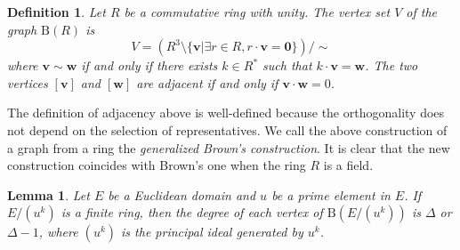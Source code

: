 \documentclass{article}
\newtheorem{Def}{Definition}
\newtheorem{Lem}{Lemma}
\newtheorem{Cor}[Lem]{Corollary}
\newcommand{\B}{\mathrm{B}}
\begin{document}
\begin{Def}
Let $R$ be a commutative ring with unity. The vertex set $V$ of the graph $\B(R)$ is 
\[ V = ( R^3 \setminus \{\bm v | \exists r \in R, r \cdot {\bm v} = {\bm 0} \} ) / \sim\]
where $\bm v \sim \bm w$ if and only if there exists $k \in R^*$ such that $k \cdot {\bm v} = {\bm w}$. The two vertices $[\bm v]$ and $[\bm w]$ are adjacent if and only if ${\bm v} \cdot {\bm w} = 0$.
\end{Def}

The definition of adjacency above is well-defined because the orthogonality does not depend on the selection of representatives. We call the above construction of a graph from a ring the {\it generalized Brown's construction}. It is clear that the new construction coincides with Brown's one when the ring $R$ is a field. 

\iffalse

\begin{Lem}
Let $R_1, R_2$ be commutative rings with unit. 
\[ \B(R_1 \times R_2) \simeq \B(R_1) \otimes \B(R_2) \]
\end{Lem}

\begin{Cor}
The followig equations hold.
\begin{enumerate}
\item $ | \B(R_1 \times R_2) | = | \B(R_1) | \times | \B(R_2) | $
\item $ \Delta(\B(R_1 \times R_2)) = \Delta(\B(R_1)) \times \Delta( \B(R_2) )$
\end{enumerate}
\end{Cor}

\fi 

\begin{Lem}\label{Lem:regular}
Let $E$ be a Euclidean domain and $u$ be a prime element in $E$. 
If $E/(u^k)$ is a finite ring, then the degree of each vertex of $\B(E/(u^k))$ is $\Delta$ or $\Delta-1$, 
where $(u^k)$ is the principal ideal generated by $u^k$. 
\end{Lem}
\end{document}

